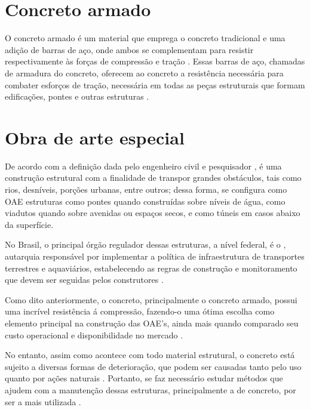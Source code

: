 \section{Concreto armado}

O concreto armado é um material que emprega o concreto tradicional e uma adição de barras de aço, onde ambos se complementam para resistir respectivamente às forças de compressão e tração \cite{Lima2014}. 
Essas barras de aço, chamadas de armadura do concreto, oferecem ao concreto a resistência necessária para combater esforços de tração, necessária em todas as peças estruturais que formam edificações, pontes e outras estruturas \cite{pinheiro2010estruturas}.

\section{Obra de arte especial}

De acordo com a definição dada pelo engenheiro civil e pesquisador ,  é uma construção estrutural com a finalidade de transpor grandes obstáculos, tais como rios, desníveis, porções urbanas, entre outros; dessa forma, se configura como OAE estruturas como pontes quando construídas sobre níveis de água, como viadutos quando sobre avenidas ou espaços secos, e como túneis em casos abaixo da superfície.

No Brasil, o principal órgão regulador dessas estruturas, a nível federal, é o , autarquia responsável por implementar a política de infraestrutura de transportes terrestres e aquaviários,
estabelecendo as regras de construção e monitoramento que devem ser seguidas pelos construtores \cite{dnitdados}.

Como dito anteriormente, o concreto, principalmente o concreto armado, possui uma incrível resistência á compressão, fazendo-o uma ótima escolha como elemento principal na construção das OAE's, ainda mais quando comparado seu custo operacional e disponibilidade no mercado \cite{santos2008armaccao}. 


No entanto, assim como acontece com todo material estrutural, o concreto está sujeito a diversas formas de deterioração, que podem ser causadas tanto pelo uso quanto por ações naturais \cite{santos2008armaccao}.
Portanto, se faz necessário estudar métodos que ajudem com a manutenção dessas estruturas, principalmente a de concreto, por ser a mais utilizada \cite{santos2008armaccao}.

